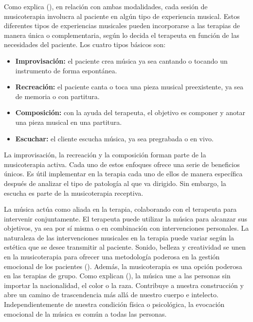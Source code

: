 Como explica \citeauthor{BRUSCIA:1998-2} (\citeyear{BRUSCIA:1998-2}), en relación con ambas modalidades, cada sesión de musicoterapia involucra al paciente en algún tipo de experiencia musical. Estos diferentes tipos de experiencias musicales pueden incorporarse a las terapias de manera única o complementaria, según lo decida el terapeuta en función de las necesidades del paciente. Los cuatro tipos básicos son:

\begin{itemize}
	\item \textbf{Improvisación:} el paciente crea música ya sea cantando o tocando un instrumento de forma espontánea.
	\item \textbf{Recreación:} el paciente canta o toca una pieza musical preexistente, ya sea de memoria o con partitura.
	\item \textbf{Composición:} con la ayuda del terapeuta, el objetivo es componer y anotar una pieza musical en una partitura.
	\item \textbf{Escuchar:} el cliente escucha música, ya sea pregrabada o en vivo.
\end{itemize}

La improvisación, la recreación y la composición forman parte de la musicoterapia activa. Cada uno de estos enfoques ofrece una serie de beneficios únicos. Es útil implementar en la terapia cada uno de ellos de manera específica después de analizar el tipo de patología al que va dirigido. Sin embargo, la escucha es parte de la musicoterapia receptiva.

La música actúa como aliada en la terapia, colaborando con el terapeuta para intervenir conjuntamente. El terapeuta puede utilizar la música para alcanzar sus objetivos, ya sea por sí misma o en combinación con intervenciones personales. La naturaleza de las intervenciones musicales en la terapia puede variar según la estética que se desee transmitir al paciente. Sonido, belleza y creatividad se unen en la musicoterapia para ofrecer una metodología poderosa en la gestión emocional de los pacientes (\cite{BRUSCIA:1998-2}). Además, la musicoterapia es una opción poderosa en las terapias de grupo. Como explican \citeauthor{PRIETO:2022} (\citeyear{PRIETO:2022}), la música une a las personas sin importar la nacionalidad, el color o la raza. Contribuye a nuestra construcción y abre un camino de trascendencia más allá de nuestro cuerpo e intelecto. Independientemente de nuestra condición física o psicológica, la evocación emocional de la música es común a todas las personas.

